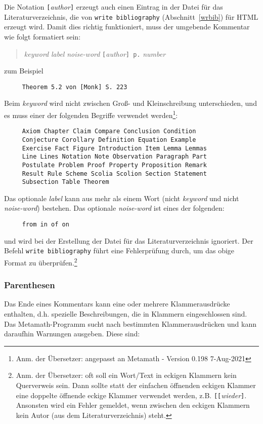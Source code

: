 Die Notation \texttt{[}{\em author}\texttt{]} erzeugt auch einen Eintrag in der Datei für das Literaturverzeichnis, die von \texttt{write bibliography} (Abschnitt~\ref{wrbib}) für {\sc HTML} erzeugt wird. Damit dies richtig funktioniert, muss der umgebende Kommentar wie folgt formatiert sein:
\begin{quote}
    {\em keyword} {\em label} {\em noise-word}
     \texttt{[}{\em author}\texttt{] p.} {\em number}
\end{quote}
zum Beispiel
\begin{verbatim}
     Theorem 5.2 von [Monk] S. 223
\end{verbatim}
Beim {\em keyword} wird nicht zwischen Groß- und Kleinschreibung unterschieden, und es muss einer der folgenden Begriffe verwendet werden\footnote{Anm. der Übersetzer: angepasst an Metamath - Version 0.198 7-Aug-2021}:
\begin{verbatim}    
     Axiom Chapter Claim Compare Conclusion Condition
     Conjecture Corollary Definition Equation Example
     Exercise Fact Figure Introduction Item Lemma Lemmas
     Line Lines Notation Note Observation Paragraph Part
     Postulate Problem Proof Property Proposition Remark
     Result Rule Scheme Scolia Scolion Section Statement
     Subsection Table Theorem
\end{verbatim}
Das optionale {\em label} kann aus mehr als einem Wort (nicht {\em keyword} und nicht {\em noise-word}) bestehen. Das optionale {\em noise-word} ist eines der folgenden:
\begin{verbatim}
     from in of on
\end{verbatim}
und wird bei der Erstellung der Datei für das Literaturverzeichnis ignoriert.  Der Befehl \texttt{write biblio\-graphy} führt eine Fehlerprüfung durch, um das obige Format zu überprüfen.\footnote{Anm. der Übersetzer: oft soll ein Wort/Text in eckigen Klammern kein Querverweis sein. Dann sollte statt der einfachen öffnenden eckigen Klammer eine doppelte öffnende eckige Klammer verwendet werden, z.B. \texttt{[}\texttt{[}{\em wieder}\texttt{]}. Ansonsten wird ein Fehler gemeldet, wenn zwischen den eckigen Klammern kein Autor (aus dem Literaturverzeichnis) steht.}

\subsubsection{Parenthesen}\label{parentheticals}

Das Ende eines Kommentars kann eine oder mehrere Klammerausdrücke enthalten, d.h. spezielle Beschreibungen, die in Klammern eingeschlossen sind. Das Metamath-Programm sucht nach bestimmten Klammerausdrücken und kann daraufhin Warnungen ausgeben. Diese sind:

